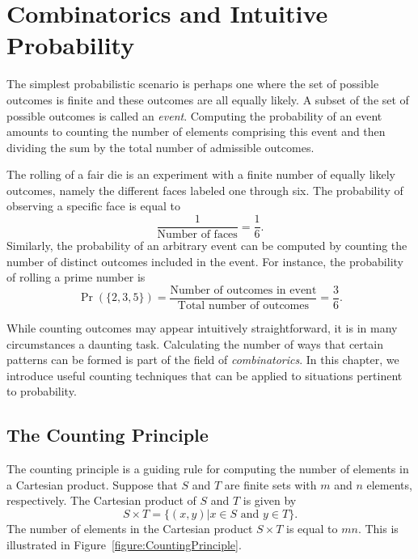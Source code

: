 \chapter[Combinatorics]{Combinatorics and Intuitive Probability}

The simplest probabilistic scenario is perhaps one where the set of possible outcomes is finite and these outcomes are all equally likely.
A subset of the set of possible outcomes is called an \emph{event}.
Computing the probability of an event amounts to counting the number of elements comprising this event and then dividing the sum by the total number of admissible outcomes.

\begin{example}
The rolling of a fair die is an experiment with a finite number of equally likely outcomes, namely the different faces labeled one through six.
The probability of observing a specific face is equal to
\begin{equation*}
\frac{1}{\text{Number of faces}} = \frac{1}{6} .
\end{equation*}
Similarly, the probability of an arbitrary event can be computed by counting the number of distinct outcomes included in the event.
For instance, the probability of rolling a prime number is
\begin{equation*}
\Pr ( \{ 2, 3, 5 \} )
= \frac{\text{Number of outcomes in event}}{\text{Total number of outcomes}}
= \frac{3}{6} .
\end{equation*}
\end{example}

While counting outcomes may appear intuitively straightforward, it is in many circumstances a daunting task.
Calculating the number of ways that certain patterns can be formed is part of the field of \emph{combinatorics}. 
In this chapter, we introduce useful counting techniques that can be applied to situations pertinent to probability.


\section{The Counting Principle}

The counting principle is a guiding rule for computing the number of elements in a Cartesian product.
Suppose that $S$ and $T$ are finite sets with $m$ and $n$ elements, respectively.
The Cartesian product of $S$ and $T$ is given by
\begin{equation*}
S \times T = \{ (x, y) | x \in S \text{ and } y \in T \} .
\end{equation*}
The number of elements in the Cartesian product $S \times T$ is equal to $m n$.
This is illustrated in Figure~\ref{figure:CountingPrinciple}.

